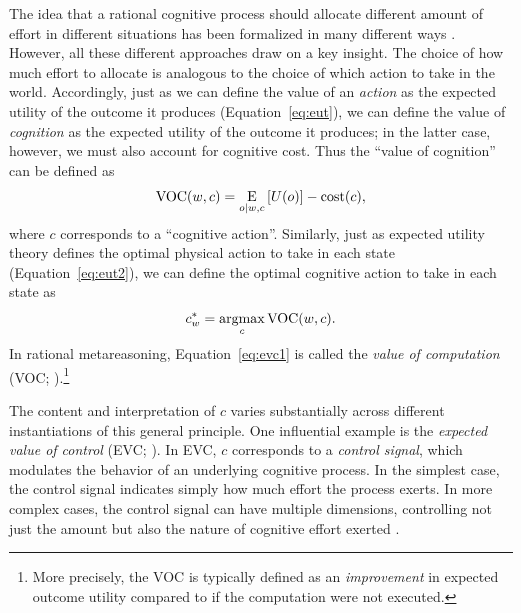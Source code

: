 
The idea that a rational cognitive process should allocate different amount of effort in different situations has been formalized in many different ways \citep{shenhav2013expected,anderson1990adaptive,lieder2017strategy}. However, all these different approaches draw on a key insight. The choice of how much effort to allocate is analogous to the choice of which action to take in the world. Accordingly, just as we can define the value of an \emph{action} as the expected utility of the outcome it produces (Equation~\ref{eq:eut}), we can define the value of \emph{cognition} as the expected utility of the outcome it produces; in the latter case, however, we must also account for cognitive cost. Thus the ``value of cognition'' can be defined as
\begin{equation}\label{eq:evc1}
  \text{VOC}(w, c) = 
    \operatorname*{E}_{o \mid w, c} \left[
      U(o)
    \right] - \text{cost}(c),
\end{equation}
where $c$ corresponds to a ``cognitive action''. Similarly, just as expected utility theory defines the optimal physical action to take in each state (Equation~\ref{eq:eut2}), we can define the optimal cognitive action to take in each state as
\begin{equation}\label{eq:evc2}
  c^*_w = \operatorname*{argmax}_c \text{VOC}(w, c).
\end{equation}
In rational metareasoning, Equation~\ref{eq:evc1} is called the \emph{value of computation} (VOC; \citealp{russell1991principles}).\footnote{%
  More precisely, the VOC is typically defined as an \emph{improvement} in expected outcome utility compared to if the computation were not executed.
}

The content and interpretation of $c$ varies substantially across different instantiations of this general principle. One influential example is the \emph{expected value of control} (EVC; \citealp{shenhav2013expected}). In EVC, $c$ corresponds to a \emph{control signal}, which modulates the behavior of an underlying cognitive process. In the simplest case, the control signal indicates simply how much effort the process exerts. In more complex cases, the control signal can have multiple dimensions, controlling not just the amount but also the nature of cognitive effort exerted \citep{musslick2015computational,grahek2020computational,ritz2021cognitive}.

